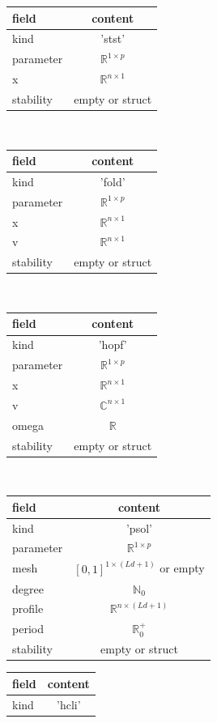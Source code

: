 \documentclass[10pt]{article}
\gdef \RR{{\mathbb R}}
\gdef \NN{{\mathbb N}}
\gdef \CC{{\mathbb C}}
\begin{document}
{\begin{table}[h]
\begin{center}
\begin{tabular}[t]{l|c}
field     & content           \\\hline
kind      & 'stst'            \\
parameter & $\RR^{1\times p}$ \\
x         & $\RR^{n\times 1}$ \\
stability & empty or struct
\end{tabular} \ \ \ 
\begin{tabular}[t]{l|c}
field     & content           \\\hline 
kind      & 'fold'            \\
parameter & $\RR^{1\times p}$ \\
x         & $\RR^{n\times 1}$ \\
v         & $\RR^{n\times 1}$ \\
stability & empty or struct
\end{tabular} \ \ \ 
\begin{tabular}[t]{l|c}
field     & content           \\\hline 
kind      & 'hopf'            \\
parameter & $\RR^{1\times p}$ \\
x         & $\RR^{n\times 1}$ \\
v         & $\CC^{n\times 1}$ \\
omega     & $\RR$             \\
stability & empty or struct
\end{tabular} \ \ \ 
\begin{tabular}[t]{l|c}
field     & content           \\\hline 
kind      & 'psol'            \\
parameter & $\RR^{1\times p}$ \\
mesh      & $[0,1]^{1\times (Ld+1)}$ or empty \\
degree    & $\NN_0$           \\
profile   & $\RR^{n\times (Ld+1)}$ \\
period    & $\RR^+_0$         \\
stability & empty or struct
\end{tabular}
\begin{tabular}[t]{l|c}
field     & content           \\\hline 
kind      & 'hcli'            \\

\end{tabular}
\end{center}
\end{table}}
\end{document}
